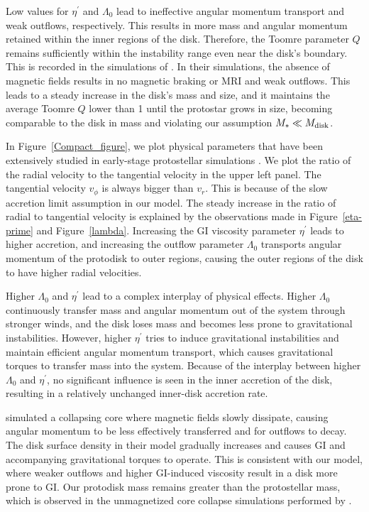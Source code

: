 \documentclass[twocolumn,linenumbers]{aastex631}
\begin{document}
Low values for $\eta^{\prime}$ and $\Lambda_0$ lead to ineffective angular momentum transport and weak outflows, respectively. This results in more mass and angular momentum retained within the inner regions of the disk.
Therefore, the Toomre parameter $Q$ remains sufficiently within the instability range even near the disk's boundary. This is recorded in the simulations of \cite{machida2010formation}. In their simulations, the absence of magnetic fields results in no magnetic braking or MRI and weak outflows. This leads to a steady increase in the disk's mass and size, and it maintains the average Toomre $Q$ lower than 1 until the protostar grows in size, becoming comparable to the disk in mass and violating our assumption $M_* \ll M_{\rm disk}$.

In Figure~\ref{Compact_figure}, we plot physical parameters that have been extensively studied in early-stage protostellar simulations \citep{machida2010formation,machida2011effect,machida2019first}. We plot the ratio of the radial velocity to the tangential velocity in the upper left panel. The tangential velocity  $v_\phi$ is always bigger than $v_r$. This is because of the slow accretion limit assumption in our model. The steady increase in the ratio of radial to tangential velocity is explained by the observations made in Figure~\ref{eta-prime} and Figure~\ref{lambda}. Increasing the GI viscosity parameter $\eta^{\prime}$ leads to higher accretion, and increasing the outflow parameter $\Lambda_0$ transports angular momentum of the protodisk to outer regions, causing the outer regions of the disk to have higher radial velocities.

Higher $\Lambda_0$ and $\eta^{\prime}$ lead to a complex interplay of physical effects. Higher $\Lambda_0$ continuously transfer mass and angular momentum out of the system through stronger winds, and the disk loses mass and becomes less prone to gravitational instabilities. However, higher $\eta^{\prime}$ tries to induce gravitational instabilities and maintain efficient angular momentum transport, which causes gravitational torques to transfer mass into the system. Because of the interplay between higher $\Lambda_0$ and $\eta^{\prime}$, no significant influence is seen in the inner accretion of the disk, resulting in a relatively unchanged inner-disk accretion rate.

\cite{machida2019first} simulated a collapsing core where magnetic fields slowly dissipate, causing angular momentum to be less effectively transferred and for outflows to decay. The disk surface density in their model gradually increases and causes GI and accompanying gravitational torques to operate. This is consistent with our model, where weaker outflows and higher GI-induced viscosity result in a disk more prone to GI. Our protodisk mass remains greater than the protostellar mass, which is observed in the unmagnetized core collapse simulations performed by \citet{machida2010formation}.
\end{document}
